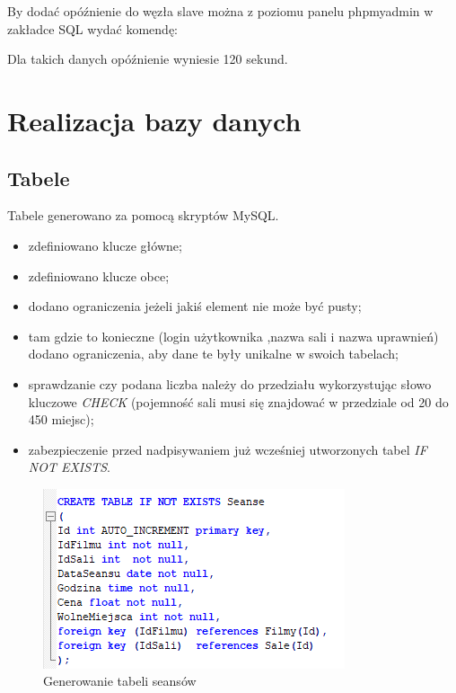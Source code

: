 By dodać opóźnienie do węzła slave można z poziomu panelu phpmyadmin w zakładce SQL wydać komendę:

\lssetdef


Dla takich danych opóźnienie wyniesie 120 sekund.

\section{Realizacja bazy danych}

\subsection{Tabele}

Tabele generowano za pomocą skryptów MySQL.

\begin{itemize}
	\item zdefiniowano klucze główne;
	\item zdefiniowano klucze obce;
	\item dodano ograniczenia jeżeli jakiś element nie może być pusty;
	\item tam gdzie to konieczne (login użytkownika ,nazwa sali i nazwa uprawnień) dodano ograniczenia, aby dane te były unikalne w swoich tabelach;
	\item sprawdzanie czy podana liczba należy do przedziału wykorzystując słowo kluczowe \textit{CHECK} (pojemność sali musi się znajdować w przedziale od 20 do 450 miejsc);
	\item zabezpieczenie przed nadpisywaniem już wcześniej utworzonych tabel \textit{IF NOT EXISTS}.
\end{itemize}

\begin{figure} [H]
	\centering
	\includegraphics[width=0.6\linewidth]{rozdzial04/T_Seanse.png}
	\caption{Generowanie tabeli seansów}
	\label{fig:t_seanse}
\end{figure}

